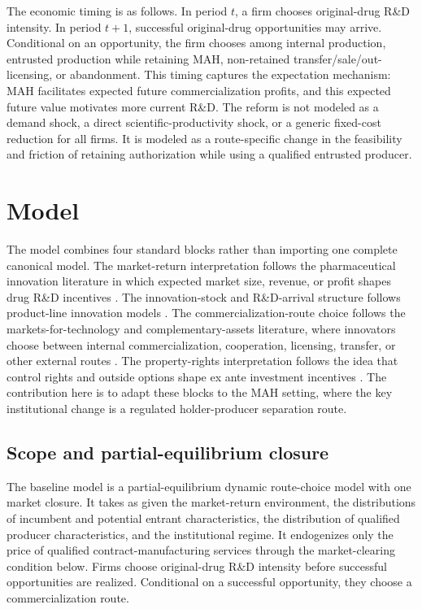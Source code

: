 \documentclass[12pt]{article}
\newcommand{\1}{\mathbf{1}}
\begin{document}
The economic timing is as follows. In period $t$, a firm chooses original-drug R\&D intensity. In period $t+1$, successful original-drug opportunities may arrive. Conditional on an opportunity, the firm chooses among internal production, entrusted production while retaining MAH, non-retained transfer/sale/out-licensing, or abandonment. This timing captures the expectation mechanism: MAH facilitates expected future commercialization profits, and this expected future value motivates more current R\&D. The reform is not modeled as a demand shock, a direct scientific-productivity shock, or a generic fixed-cost reduction for all firms. It is modeled as a route-specific change in the feasibility and friction of retaining authorization while using a qualified entrusted producer.

\section{Model}

The model combines four standard blocks rather than importing one complete canonical model. The market-return interpretation follows the pharmaceutical innovation literature in which expected market size, revenue, or profit shapes drug R\&D incentives \citep{AcemogluLinn2004,DuboisDeMouzonScottMortonSeabright2015,BarwickXiaXia2026}. The innovation-stock and R\&D-arrival structure follows product-line innovation models \citep{KletteKortum2004}. The commercialization-route choice follows the markets-for-technology and complementary-assets literature, where innovators choose between internal commercialization, cooperation, licensing, transfer, or other external routes \citep{Teece1986,AroraFosfuriGambardella2001,GansStern2003}. The property-rights interpretation follows the idea that control rights and outside options shape ex ante investment incentives \citep{GrossmanHart1986,HartMoore1990}. The contribution here is to adapt these blocks to the MAH setting, where the key institutional change is a regulated holder-producer separation route.

\subsection{Scope and partial-equilibrium closure}

The baseline model is a partial-equilibrium dynamic route-choice model with one market closure. It takes as given the market-return environment, the distributions of incumbent and potential entrant characteristics, the distribution of qualified producer characteristics, and the institutional regime. It endogenizes only the price of qualified contract-manufacturing services through the market-clearing condition below. Firms choose original-drug R\&D intensity before successful opportunities are realized. Conditional on a successful opportunity, they choose a commercialization route.
\end{document}
